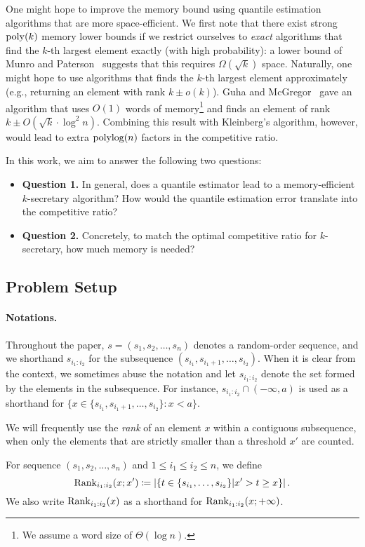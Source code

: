 One might hope to improve the memory bound using quantile estimation algorithms that are more space-efficient. We first note that there exist strong $\operatorname*{poly}(k)$ memory lower bounds if we restrict ourselves to \emph{exact} algorithms that find the $k$-th largest element exactly (with high probability): a lower bound of Munro and Paterson~\cite{MP80} suggests that this requires $\Omega(\sqrt{k})$ space. Naturally, one might hope to use algorithms that finds the $k$-th largest element approximately (e.g., returning an element with rank $k \pm o(k)$). Guha and McGregor~\cite{guha2009stream} gave an algorithm that uses $O(1)$ words of memory\footnote{We assume a word size of $\Theta(\log n)$.} and finds an element of rank $k \pm O(\sqrt{k}\cdot \log^2n)$. Combining this result with Kleinberg's algorithm, however, would lead to extra $\operatorname*{polylog}(n)$ factors in the competitive ratio.

In this work, we aim to answer the following two questions:
\begin{itemize}
    \item \textbf{Question 1.} In general, does a quantile estimator lead to a memory-efficient $k$-secretary algorithm? How would the quantile estimation error translate into the competitive ratio?
    \item \textbf{Question 2.} Concretely, to match the optimal competitive ratio for $k$-secretary, how much memory is needed? 
\end{itemize}

\subsection{Problem Setup}
\paragraph{Notations.} Throughout the paper, $s = (s_1, s_2, \ldots, s_n)$ denotes a random-order sequence, and we shorthand $s_{i_1:i_2}$ for the subsequence $(s_{i_1}, s_{i_1 + 1}, \ldots, s_{i_2})$. When it is clear from the context, we sometimes abuse the notation and let $s_{i_1:i_2}$ denote the set formed by the elements in the subsequence. For instance, $s_{i_1:i_2} \cap (-\infty, a)$ is used as a shorthand for $\{x \in \{s_{i_1}, s_{i_1 + 1}, \ldots, s_{i_2}\}: x < a\}$.

We will frequently use the \emph{rank} of an element $x$ within a contiguous subsequence, when only the elements that are strictly smaller than a threshold $x'$ are counted.
\begin{definition}[Rank]\label{def:rank}
For sequence $(s_1, s_2, \ldots, s_n)$ and $1 \le i_1 \le i_2 \le n$, we define
\[
    \mathrm{Rank}_{i_1:i_2}(x; x')\coloneqq  \left|\left\{t\in \{s_{i_1}, \ldots, s_{i_2}\}| x' > t \ge x\right\}\right|.
\]
We also write $\mathrm{Rank}_{i_1:i_2}(x)$ as a shorthand for $\mathrm{Rank}_{i_1:i_2}(x; +\infty)$.
\end{definition}

